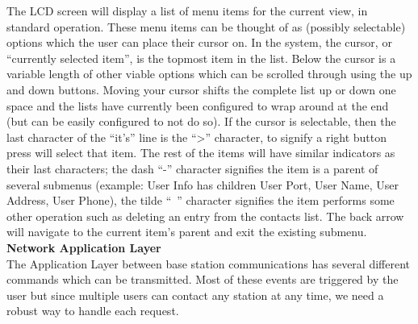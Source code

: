 \documentclass[journal,compsoc]{IEEEtran}
\begin{document}
\noindent The LCD screen will display a list of menu items for the current view, in standard operation.  These menu items can be thought of as (possibly selectable) options which the user can place their cursor on.  In the system, the cursor, or “currently selected item”, is the topmost item in the list.  Below the cursor is a variable length of other viable options which can be scrolled through using the up and down buttons.  Moving your cursor shifts the complete list up or down one space and the lists have currently been configured to wrap around at the end (but can be easily configured to not do so).  If the cursor is selectable, then the last character of the “it’s” line is the “>” character, to signify a right button press will select that item.  The rest of the items will have similar indicators as their last characters; the dash “-” character signifies the item is a parent of several submenus (example:  User Info has children {User Port, User Name, User Address, User Phone}), the tilde “~” character signifies the item performs some other operation such as deleting an entry from the contacts list.  The back arrow will navigate to the current item’s parent and exit the existing submenu.\\

\noindent \textbf {Network Application Layer}\\
The Application Layer between base station communications has several different commands which can be transmitted.  Most of these events are triggered by the user but since multiple users can contact any station at any time, we need a robust way to handle each request.\\
\end{document}
